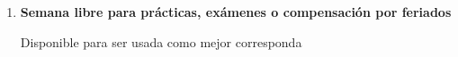 \documentclass[11pt]{article}
\begin{document}
\begin{enumerate}


\item \textbf{Semana libre para prácticas, exámenes o compensación por feriados}
\vspace{-0.15cm}
\begin{description}
\item[Disponible para ser usada como mejor corresponda]
\end{description}

\end{enumerate}



\nocite{jaynes1984-bayesianBackground, mcelreath2020-rethinking, bishop2006-PRML, pearl2009-causality, cinelli2021-crashCourse, stan-userGuide, martin2022-BMCP, samaja1999-epistemologiaMetodologia }

{

}
\end{document}
